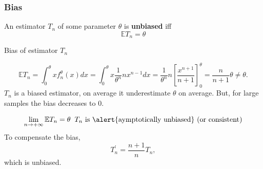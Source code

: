 \documentclass[xcolor=x11names,compress,8pt,handout]{beamer}
\def\Esp{\mathbb{E}}
\renewcommand{\(}{\begin{columns}}
\renewcommand{\)}{\end{columns}}
\newcommand{\<}[1]{\begin{column}{#1}}
\renewcommand{\>}{\end{column}}
\begin{document}
\begin{frame}
\frametitle{Bias}
An estimator $T_n$ of some parameter $\theta$ is \textbf{unbiased} iff 
\[
\Esp T_n =\theta
\]
\begin{example}{Bias of estimator $T_n$}

\[
\Esp T_n =\int_0^\theta x f_n^\theta(x) dx=\int_0^\theta x\frac 1{\theta^n} n x^{n-1}dx=\frac 1{\theta^n} n \left[\frac {x^{n+1}}{n+1}\right]_0^\theta=\frac n {n+1}\theta \neq \theta.
\]
$T_n$ is a biased estimator, on average it underestimate $\theta$ on average. But, for large samples the bias decreases to $0$.

\[
\lim_{n\to +\infty}\Esp T_n = \theta \;\; T_n \text{ is \alert{aymptotically unbiased} (or consistent)}
\]
To compensate the bias, 
\[
T^\prime_n = \frac {n+1}n T_n,
\]
which is unbiased.
\end{example}
\end{frame}
\end{document}

